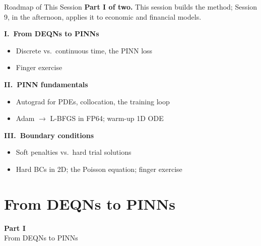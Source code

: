 \documentclass[aspectratio=169,11pt]{beamer}
\begin{document}
\begin{frame}{Roadmap of This Session}
\textbf{Part I of two.}  This session builds the method; Session 9, in the afternoon, applies it to
economic and financial models.

\vspace{0.6em}
\textbf{I.\ From DEQNs to PINNs}
\begin{itemize}\setlength\itemsep{1pt}
    \item Discrete vs.\ continuous time, the PINN loss
    \item Finger exercise
\end{itemize}

\vspace{0.5em}
\textbf{II.\ PINN fundamentals}
\begin{itemize}\setlength\itemsep{1pt}
    \item Autograd for PDEs, collocation, the training loop
    \item Adam $\to$ L-BFGS in FP64; warm-up 1D ODE
\end{itemize}

\vspace{0.5em}
\textbf{III.\ Boundary conditions}
\begin{itemize}\setlength\itemsep{1pt}
    \item Soft penalties vs.\ hard trial solutions
    \item Hard BCs in 2D; the Poisson equation; finger exercise
\end{itemize}
\end{frame}


\section{From DEQNs to PINNs}

\begin{frame}{}
\vfill
\begin{center}
{\Huge \textcolor{uzhblue}{\textbf{Part I}}}\\[12pt]
{\LARGE From DEQNs to PINNs}
\end{center}
\vfill
\end{frame}
\end{document}

